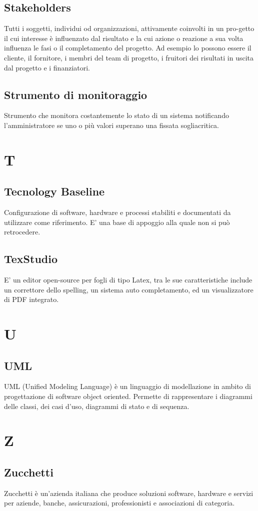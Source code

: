     \subsection*{Stakeholders}
Tutti i soggetti, individui od organizzazioni, attivamente coinvolti in un pro-getto il cui interesse è influenzato dal risultato e la cui azione o reazione a sua volta influenza le fasi o il completamento del progetto.  Ad esempio lo possono essere il cliente, il fornitore, i membri del team di progetto, i fruitori dei risultati in uscita dal progetto e i finanziatori.
    \subsection*{Strumento di monitoraggio}
Strumento che monitora costantemente lo stato di un sistema notificando l’amministratore se uno o più valori superano una fissata sogliacritica.
\newpage

\section{T}
    \subsection*{Tecnology Baseline}
Configurazione di software, hardware e processi stabiliti e documentati da utilizzare come riferimento. E’ una base di appoggio alla quale non si può retrocedere.
    \subsection*{TexStudio}
E’ un editor open-source per fogli di tipo Latex, tra le sue caratteristiche include un correttore dello spelling, un sistema auto completamento, ed un visualizzatore di  PDF integrato.
\newpage

\section{U}
    \subsection*{UML}
UML (Unified Modeling Language) è un linguaggio di modellazione in ambito di progettazione di software object oriented. Permette di rappresentare i diagrammi delle classi, dei casi d’uso, diagrammi di stato e di sequenza.
\newpage

\section{Z}
    \subsection*{Zucchetti}
Zucchetti è un’azienda italiana che produce soluzioni software, hardware e servizi per aziende, banche, assicurazioni, professionisti e associazioni di categoria.
\newpage
